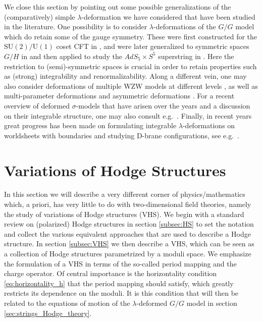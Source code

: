 \documentclass[11pt,a4paper]{article}
\numberwithin{equation}{section}
\numberwithin{table}{section}\setlength{\multlinegap}{25pt}
\begin{document}
We close this section by pointing out some possible generalizations of the (comparatively) simple $\lambda$-deformation we have considered that have been studied in the literature. One possibility is to consider $\lambda$-deformations of the $G/G$ model which do retain some of the gauge symmetry. These were first constructed for the $\mathrm{SU}(2)/\mathrm{U}(1)$ coset CFT in \cite{Sfetsos:2014_integrability}, and were later generalized to symmetric spaces $G/H$ in \cite{Hollowood:2014} and then applied to study the $AdS_5\times S^5$ superstring in \cite{Hollowood:2014qma}. Here the restriction to (semi)-symmetric spaces is crucial in order to retain properties such as (strong) integrability and renormalizability. Along a different vein, one may also consider deformations of multiple WZW models at different levels \cite{Georgiou:2018gpe}, as well as multi-parameter deformations \cite{Sfetsos:2015nya} and asymmetric deformations \cite{Georgiou:2016urf,Driezen:2019ykp}. For a recent overview of deformed $\sigma$-models that have arisen over the years and a discussion on their integrable structure, one may also consult e.g.~\cite{Georgiou:2021pbd}. Finally, in recent years great progress has been made on formulating integrable $\lambda$-deformations on worldsheets with boundaries and studying D-brane configurations, see e.g.~\cite{Alekseev:1998mc,Driezen:2018glg,Sfetsos:2021pcs}. 

\section{Variations of Hodge Structures}
\label{sec:Hodge_theory}

In this section we will describe a very different corner of physics/mathematics which, a priori, has very little to do with two-dimensional field theories, namely the study of variations of Hodge structures (VHS). We begin with a standard review on (polarized) Hodge structures in section \ref{subsec:HS} to set the notation and collect the various equivalent approaches that are used to describe a Hodge structure. In section \ref{subsec:VHS} we then describe a VHS, which can be seen as a collection of Hodge structures parametrized by a moduli space. We emphasize the formulation of a VHS in terms of the so-called period mapping and the charge operator. Of central importance is the horizontality condition \eqref{eq:horizontality_h} that the period mapping should satisfy, which greatly restricts its dependence on the moduli. It is this condition that will then be related to the equations of motion of the $\lambda$-deformed $G/G$ model in section \ref{sec:strings_Hodge_theory}. 
\end{document}
